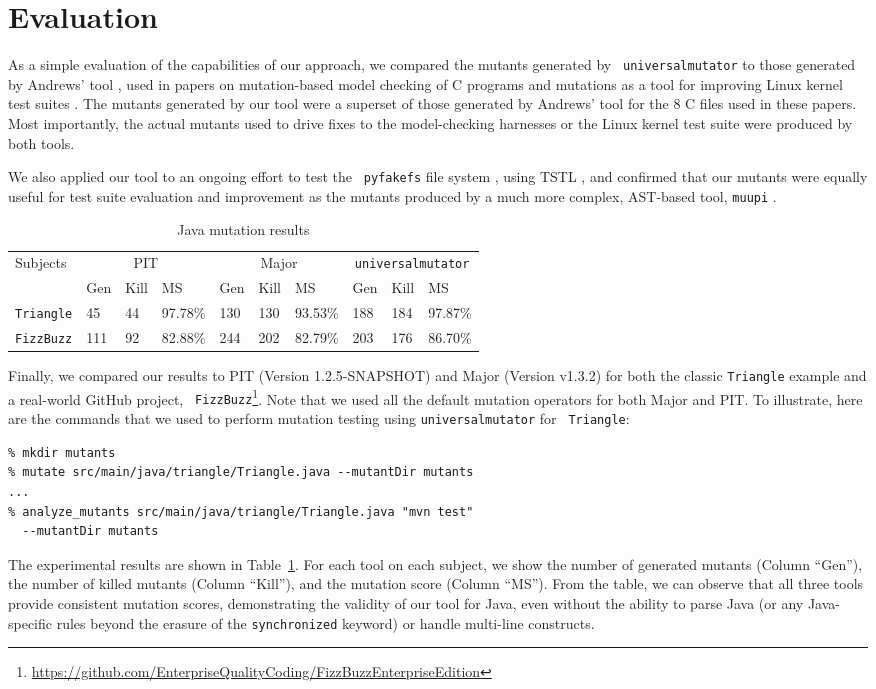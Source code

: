 \section{Evaluation}

As a simple evaluation of the capabilities of our approach, we compared the mutants generated by {\tt
  universalmutator} to those generated by Andrews' tool \cite{mutant},
used in papers on mutation-based model checking of C programs
\cite{ASE15} and mutations as a tool for improving Linux kernel test
suites \cite{mutation17}.  The mutants generated by our tool were a
superset of those generated by Andrews' tool for the 8 C files used in
these papers.  Most importantly, the actual mutants used to drive
fixes to the model-checking harnesses or the Linux kernel test suite
were produced by both tools.

We also applied our tool to an ongoing effort to test the {\tt
  pyfakefs} file system \cite{pyfakefs}, using TSTL \cite{nfm15,tstlsttt},
and confirmed that our mutants were equally useful for test suite
evaluation and improvement as the mutants produced by a much more
complex, AST-based tool, {\tt muupi} \cite{muupi}.
\begin{table}[t!]
  \scriptsize
  \caption{\label{tab:java} Java mutation results}
  \begin{tabular}{|l|lll|lll|lll|}
    \hline
    Subjects&\multicolumn{3}{c|}{PIT}&\multicolumn{3}{c|}{Major}&\multicolumn{3}{c|}{{\tt universalmutator}}\\
    &Gen&Kill&MS&Gen&Kill&MS&Gen&Kill&MS\\\hline
\hline
    {\tt Triangle}&45&44&97.78\%&130&130&93.53\%&188&184&97.87\%\\
{\tt FizzBuzz}&111&92&82.88\%&244&202&82.79\%&203&176&86.70\%\\
  \hline\end{tabular}
  \end{table}

Finally, we compared our results to PIT (Version 1.2.5-SNAPSHOT)
\cite{pittest} and Major (Version v1.3.2) \cite{major} for both the
classic {\tt Triangle} example and a real-world GitHub project, {\tt
  FizzBuzz}\footnote{\url{https://github.com/EnterpriseQualityCoding/FizzBuzzEnterpriseEdition}
}.  Note that we used all the default mutation operators for both
Major and PIT. To illustrate, here are the commands that we used to
perform mutation testing using {\tt universalmutator} for {\tt
  Triangle}:
{\scriptsize
\begin{verbatim}
% mkdir mutants
% mutate src/main/java/triangle/Triangle.java --mutantDir mutants
...
% analyze_mutants src/main/java/triangle/Triangle.java "mvn test"
  --mutantDir mutants
\end{verbatim}
} The experimental results are shown in Table~\ref{tab:java}. For each
tool on each subject, we show the number of generated mutants
(Column ``Gen''), the number of killed mutants (Column ``Kill''), and
the mutation score (Column ``MS''). From the table, we can observe that all three tools provide consistent mutation scores, demonstrating the validity of our tool for Java, even without the ability to parse Java (or any Java-specific rules beyond the erasure of the {\tt synchronized} keyword) or handle multi-line constructs.

